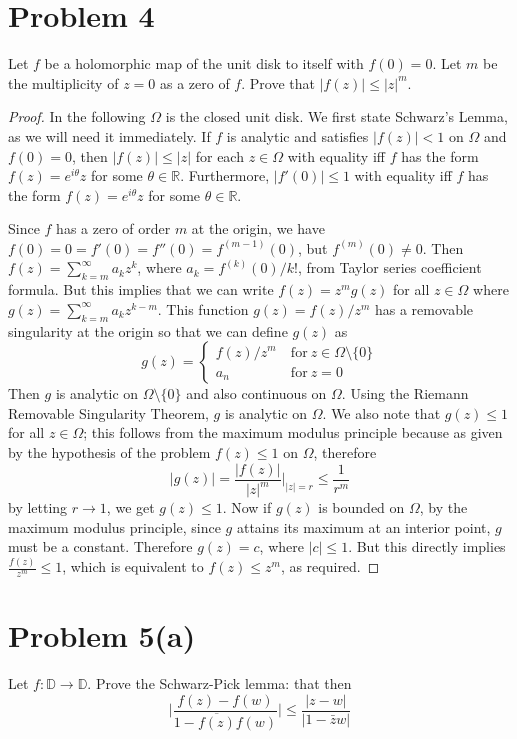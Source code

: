 \documentclass{article}[12pt]
\def\RR{\mathbb R}
\def\DD{\mathbb D}
\begin{document}
\section*{Problem 4}Let $f$ be a holomorphic map of the unit disk
to itself with $f(0)=0$. Let $m$ be the multiplicity of $z=0$ as
a zero of $f$. Prove that $|f(z)|\le |z|^m$.
\begin{proof}
In the following $\Omega$ is the closed unit disk.
We first state Schwarz's Lemma, as we will need it immediately.
If $f$ is analytic and satisfies $|f(z)|<1$ on $\Omega$
and $f(0)=0$, then $|f(z)|\le |z|$ for each $z\in\Omega$ with
equality iff $f$ has the form $f(z)=e^{i\theta}z$ for some $\theta\in\RR$.
Furthermore, $|f'(0)|\le 1$ with equality iff 
$f$ has the form $f(z)=e^{i\theta}z$ for some $\theta\in\RR$.

Since $f$ has a zero of order $m$ at the origin, we have
$f(0)=0=f'(0)=f''(0)=f^{(m-1)}(0)$, but $f^{(m)}(0)\ne 0$.
Then $f(z)=\sum_{k=m}^\infty a_kz^k$, where $a_k=f^{(k)}(0)/k!$, from
Taylor series coefficient formula.
But this implies that we can write $f(z)=z^mg(z)$ for all $z\in\Omega$
where $g(z)=\sum_{k=m}^\infty a_kz^{k-m}$.
This function $g(z)=f(z)/z^m$ has a removable singularity at the 
origin so that we can define $g(z)$ as
\[
g(z) = \left\{ \begin{array}{lc} f(z)/z^m\ & \mbox{for}\ z\in\Omega\setminus \{0\} \\
a_n & \mbox{for}\ z=0 \end{array}\right.
\]
Then $g$ is analytic on $\Omega\setminus\{0\}$ and also continuous
on $\Omega$. Using the Riemann Removable Singularity Theorem,
$g$ is analytic on $\Omega$. 
We also note that $g(z)\le 1$ for all $z\in\Omega$; this follows
from the maximum modulus principle because as given by the hypothesis
of the problem $f(z)\le 1$ on $\Omega$, therefore
\[
|g(z)| = \frac{|f(z)|}{|z|^m}|_{|z|=r} \le \frac{1}{r^m}
\]
by letting $r\to 1$, we get $g(z)\le 1$.
Now if $g(z)$ is bounded on $\Omega$, by the maximum modulus principle,
since $g$ attains its maximum at an interior point, $g$ must be a constant.
Therefore $g(z)=c$, where $|c|\le 1$. But this directly implies 
$\frac{f(z)}{z^m}\le 1$, which is equivalent to $f(z)\le z^m$, as
required.
\end{proof}



\section*{Problem 5(a)}
Let $f:\DD\to\DD$. Prove the Schwarz-Pick lemma: that then
\[
\lvert \frac{f(z)-f(w)}{1-\overline{f(z)}f(w)}\rvert \le
\frac{\lvert z-w\rvert}{\lvert 1-\bar{z}w\rvert}
\]
\end{document}
